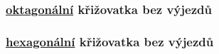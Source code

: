 \subsubsection{ \hyperref[subsec:oktagonalni_typ]{oktagonální} křižovatka bez výjezdů}
\label{subsubsec:exp_ars_velka_oktagonalni_krizovatka_noex}

\subsubsection{ \hyperref[subsec:hexagonalni_typ]{hexagonální} křižovatka bez výjezdů}
\label{subsubsec:exp_ars_velka_hexagoalni_krizovatka_noex}
